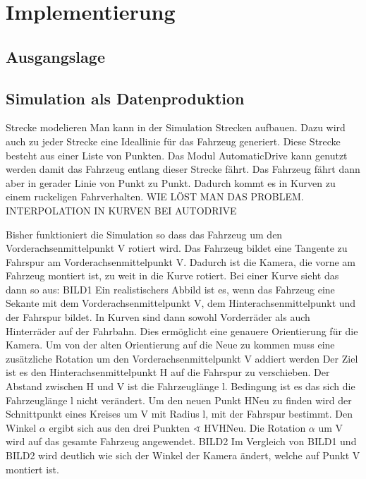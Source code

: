 
\chapter{Implementierung}

\section{Ausgangslage}

\section{Simulation als Datenproduktion}
Strecke modelieren
Man kann in der Simulation Strecken aufbauen. Dazu wird auch zu jeder Strecke eine Ideallinie für das Fahrzeug generiert.
Diese Strecke besteht aus einer Liste von Punkten.
Das Modul AutomaticDrive kann genutzt werden damit das Fahrzeug entlang dieser Strecke fährt.
Das Fahrzeug fährt dann aber in gerader Linie von Punkt zu Punkt. 
Dadurch kommt es in Kurven zu einem ruckeligen Fahrverhalten.
WIE LÖST MAN DAS PROBLEM. INTERPOLATION IN KURVEN BEI AUTODRIVE

Bisher funktioniert die Simulation so dass das Fahrzeug um den Vorderachsenmittelpunkt V rotiert wird.
Das Fahrzeug bildet eine Tangente zu Fahrspur am Vorderachsenmittelpunkt V.
Dadurch ist die Kamera, die vorne am Fahrzeug montiert ist, zu weit in die Kurve rotiert.
Bei einer Kurve sieht das dann so aus:
BILD1
Ein realistischers Abbild ist es, wenn das Fahrzeug eine Sekante mit dem Vorderachsenmittelpunkt V, dem Hinterachsenmittelpunkt und der Fahrspur bildet.
In Kurven sind dann sowohl Vorderräder als auch Hinterräder auf der Fahrbahn.
Dies ermöglicht eine genauere Orientierung für die Kamera.
Um von der alten Orientierung auf die Neue zu kommen muss eine zusätzliche Rotation um den Vorderachsenmittelpunkt V addiert werden
Der Ziel ist es den Hinterachsenmittelpunkt H auf die Fahrspur zu verschieben.
Der Abstand zwischen H und V ist die Fahrzeuglänge l.
Bedingung ist es das sich die Fahrzeuglänge l nicht verändert.
Um den neuen Punkt HNeu zu finden wird der Schnittpunkt eines Kreises um V mit Radius l, mit der Fahrspur bestimmt.
Den Winkel $\alpha$ ergibt sich aus den drei Punkten $\sphericalangle$ HVHNeu. 
Die Rotation $\alpha$ um V wird auf das gesamte Fahrzeug angewendet.
BILD2
Im Vergleich von BILD1 und BILD2 wird deutlich wie sich der Winkel der Kamera ändert, welche auf Punkt V montiert ist.



